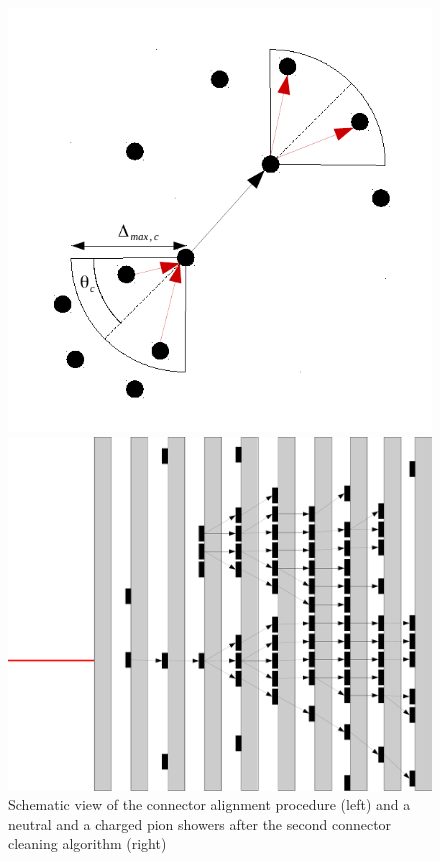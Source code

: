 \documentclass[cits]{JINST}
\begin{document}
\begin{figure}[!h]
  \begin{minipage}{0.4\linewidth}
    \begin{center}
      \includegraphics[width=0.8\linewidth]{ConnectorAlignment.pdf}
    \end{center}
  \end{minipage}
  \begin{minipage}{0.58\linewidth}
    \begin{center}
      \includegraphics[width=0.8\linewidth]{ConnectorCleaning2.pdf}
    \end{center}
  \end{minipage}
  \caption{\label{ARBOR_CONNECTOR_ALIGNEMENT} \label{ARBOR_CONNECTOR_CLEANING_2} Schematic view of the connector alignment procedure (left) and a neutral and a charged pion showers after the second connector cleaning algorithm (right)}
\end{figure}
\end{document}
